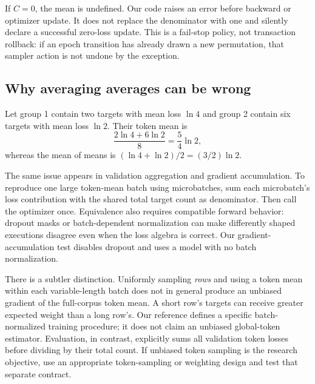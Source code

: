 If $C=0$, the mean is undefined. Our code raises an error before backward or optimizer update. It does not replace the denominator with one and silently declare a successful zero-loss update. This is a fail-stop policy, not transaction rollback: if an epoch transition has already drawn a new permutation, that sampler action is not undone by the exception.

\subsection{Why averaging averages can be wrong}


Let group 1 contain two targets with mean loss $\ln4$ and group 2 contain six targets with mean loss $\ln2$. Their token mean is
\begin{equation}
\frac{2\ln4+6\ln2}{8}=\frac54\ln2,
\end{equation}
whereas the mean of means is $(\ln4+\ln2)/2=(3/2)\ln2$.

The same issue appears in validation aggregation and gradient accumulation. To reproduce one large token-mean batch using microbatches, sum each microbatch's loss contribution with the shared total target count as denominator. Then call the optimizer once. Equivalence also requires compatible forward behavior: dropout masks or batch-dependent normalization can make differently shaped executions disagree even when the loss algebra is correct. Our gradient-accumulation test disables dropout and uses a model with no batch normalization.

There is a subtler distinction. Uniformly sampling \emph{rows} and using a token mean within each variable-length batch does not in general produce an unbiased gradient of the full-corpus token mean. A short row's targets can receive greater expected weight than a long row's. Our reference defines a specific batch-normalized training procedure; it does not claim an unbiased global-token estimator. Evaluation, in contrast, explicitly sums all validation token losses before dividing by their total count. If unbiased token sampling is the research objective, use an appropriate token-sampling or weighting design and test that separate contract.

